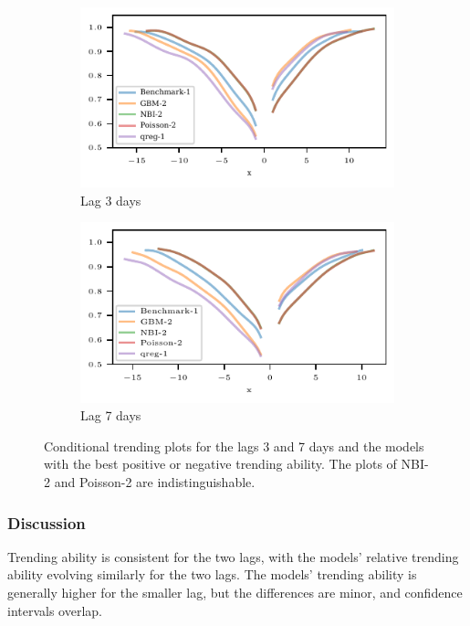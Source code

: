\begin{figure}
    \centering
    \begin{subfigure}[t]{0.48\textwidth}
    \includegraphics{plots/ed_arrival/50_Cond_Prob_lag_3}
    \caption{Lag 3 days}
    \end{subfigure}\hfill
    \begin{subfigure}[t]{0.48\textwidth}
    \includegraphics{plots/ed_arrival/50_Cond_Prob_lag_7}
    \caption{Lag 7 days}
    \end{subfigure}
    \caption{Conditional trending plots for the lags 3 and 7 days and the models with the best positive or negative trending ability. The plots of NBI-2 and Poisson-2 are indistinguishable.}
    \label{fig:app-eda-cond-prob}
\end{figure}

\subsubsection*{Discussion}

Trending ability is consistent for the two lags, with the models' relative trending ability evolving similarly for the two lags.
The models' trending ability is generally higher for the smaller lag, but the differences are minor, and confidence intervals overlap.

